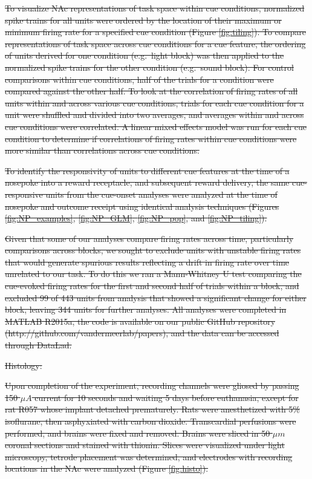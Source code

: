 \documentclass[11pt]{article}
\providecommand{\DIFdel}[1]{{\protect\color{red}\sout{#1}}}                      %
\begin{document}
\DIFdel{To visualize NAc representations of task space within cue conditions,
normalized spike trains for all units were ordered by the location of
their maximum or minimum firing rate for a specified cue condition
(Figure \ref{fig:tiling}). To compare representations of task space
across cue conditions for a cue feature, the ordering of units derived
for one condition (e.g.\ light block) was then applied to the
normalized spike trains for the other condition (e.g.\ sound
block). For control comparisons within cue conditions, half of the
trials for a condition were compared against the other half. To look
at the correlation of firing rates of all units within and across
various cue conditions, trials for each cue condition for a unit were
shuffled and divided into two averages, and averages within and across
cue conditions were correlated. A linear mixed effects model was run
for each cue condition to determine if correlations of firing rates
within cue conditions were more similar than correlations across cue
conditions.
}%

\DIFdel{To identify the responsivity of units to different cue features at the
time of a nosepoke into a reward receptacle, and subsequent reward
delivery, the same cue-responsive units from the cue-onset analyses
were analyzed at the time of nosepoke and outcome receipt using
identical analysis techniques (Figures \ref{fig:NP_examples},
\ref{fig:NP_GLM}, \ref{fig:NP_pop}, and \ref{fig:NP_tiling}).
}%

\DIFdel{Given that some of our analyses compare firing rates across time,
particularly comparisons across blocks, we sought to exclude units
with unstable firing rates that would generate spurious results
reflecting a drift in firing rate over time unrelated to our task. To
do this we ran a Mann-Whitney U test comparing the cue-evoked firing
rates for the first and second half of trials within a block, and
excluded 99 of 443 units from analysis that showed a significant change for
either block, leaving 344 units for further analyses. All analyses were completed in MATLAB R2015a, the code
is available on our public GitHub repository
(http://github.com/vandermeerlab/papers), and the data can be accessed
through DataLad.
}%

\DIFdel{Histology:}%

\DIFdel{Upon completion of the experiment, recording channels were gliosed by passing 150 $\mu A$ current for 10 seconds and waiting 5 days before euthanasia, except for rat R057 whose implant detached prematurely. Rats were anesthetized with 5\%
isoflurane, then asphyxiated with carbon dioxide. Transcardial
perfusions were performed, and brains were fixed and removed. Brains
were sliced in 50 $\mu m$ coronal sections and stained with
thionin. Slices were visualized under light microscopy, tetrode
placement was determined, and electrodes with recording locations in
the NAc were analyzed (Figure \ref{fig:histo}).
}%
\end{document}
